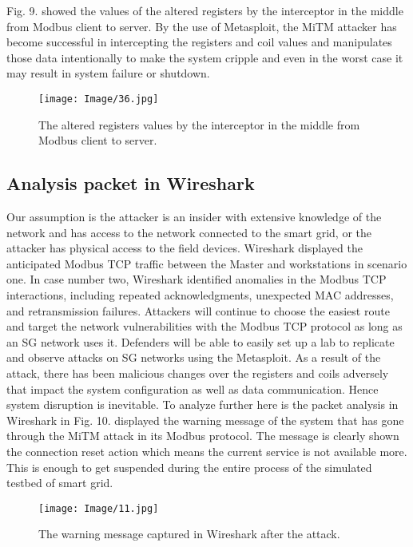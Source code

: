 \documentclass[letterpaper,10pt,conference]{IEEEtran}
\begin{document}
Fig. 9. showed the values of the altered registers by the interceptor in the middle from Modbus client to server. By the use of Metasploit, the MiTM attacker has become successful in intercepting the registers and coil values and manipulates those data intentionally to make the system cripple and even in the worst case it may result in system failure or shutdown.

\begin{figure}[h!]
\centering
\texttt{[image: Image/36.jpg]}
\caption{The altered registers values by the interceptor in the middle from Modbus client to server.}
\label{Fig. 8}
\end{figure}


\subsection{Analysis packet in Wireshark}
Our assumption is the attacker
is an insider with extensive knowledge of the network and has access to the network connected to the smart grid, or the attacker has physical access to the field devices. Wireshark displayed the anticipated Modbus TCP traffic between the Master and workstations in scenario one. In case number two, Wireshark identified anomalies in the Modbus TCP interactions, including repeated acknowledgments, unexpected MAC addresses, and retransmission failures. Attackers will continue to choose the easiest route and target the network vulnerabilities with the Modbus TCP protocol as long as an SG network uses it. Defenders will be able to easily set up a lab to replicate and observe attacks on SG networks using the Metasploit. As a result of the attack, there has been malicious changes over the registers and coils adversely that impact the system configuration as well as data communication. Hence system disruption is inevitable. To analyze further here is the packet analysis in Wireshark in Fig. 10. displayed the warning message of the system that has gone through the MiTM attack in its Modbus protocol. The message is clearly shown the connection reset action which means the current service is not available more. This is enough to get suspended during the entire process of the simulated testbed of smart grid.



\begin{figure}[h!]
\centering
\texttt{[image: Image/11.jpg]}
\caption{The warning message captured in Wireshark after the attack.}
\label{Fig.13}
\end{figure}
\end{document}
